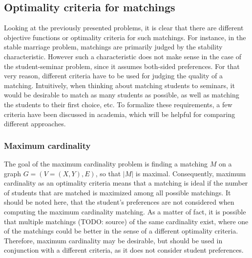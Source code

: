 \subsection{Optimality criteria for matchings}
Looking at the previously presented problems, it is clear that there are different objective functions or optimality criteria for such matchings. For instance, in the stable marriage problem, matchings are primarily judged by the stability characteristic. However such a characteristic does not make sense in the case of the student-seminar problem, since it assumes both-sided preferences. For that very reason, different criteria have to be used for judging the quality of a matching.
\newline
Intuitively, when thinking about matching students to seminars, it would be desirable to match as many students as possible, as well as matching the students to their first choice, etc. To formalize these requirements, a few criteria have been discussed in academia, which will be helpful for comparing different approaches. 

\subsubsection{Maximum cardinality}
The goal of the maximum cardinality problem is finding a matching $M$ on a graph $G=(V=(X, Y), E)$, so that $|M|$ is maximal.\cite{GraphTheoryIntro} Consequently, maximum cardinality as an optimality criteria means that a matching is ideal if the number of students that are matched is maximized among all possible matchings. It should be noted here, that the student's preferences are not considered when computing the maximum cardinality matching. As a matter of fact, it is possible that multiple matchings (TODO: source) of the same cardinality exist, where one of the matchings could be better in the sense of a different optimality criteria. Therefore, maximum cardinality may be desirable, but should be used in conjunction with a different criteria, as it does not consider student preferences.

